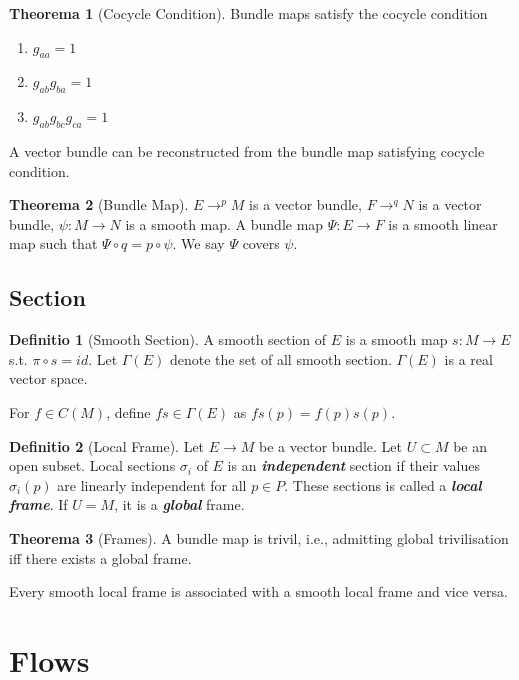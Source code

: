 \documentclass[12pt, a4paper]{article}
\theoremstyle{definition}
\newtheorem{theorem}{Theorema}[section]
\newtheorem{definition}{Definitio}[section]
\theoremstyle{remark}
\renewcommand{\emph}[1]{\textbf{\textit{#1}}}
\begin{document}
\begin{theorem}[Cocycle Condition]
	Bundle maps satisfy the cocycle condition 
	\begin{enumerate}
		\item $g_{aa} = 1$
		\item $g_{ab}g_{ba} = 1$
		\item $g_{ab}g_{bc}g_{ca} = 1$
	\end{enumerate}

	A vector bundle can be reconstructed from the bundle map satisfying cocycle condition.
\end{theorem}

\begin{theorem}[Bundle Map]
	$E \rightarrow^p M$ is a vector bundle, $F \rightarrow^q N $ is a vector bundle, $\psi: M \rightarrow N$ is a smooth map. A bundle map $\Psi: E \rightarrow F$ is a smooth linear map such that $\Psi \circ q = p \circ \psi$.
	We say $\Psi$ covers $\psi$.
\end{theorem}

\subsection{Section}
	
\begin{definition}[Smooth Section]
	A smooth section of $E$ is a smooth map $s: M \rightarrow E$ s.t. $\pi \circ s = id$. 
	Let $\Gamma (E)$ denote the set of all smooth section.
	$\Gamma(E)$ is a real vector space.

	For $f \in C(M)$, define $fs \in \Gamma(E)$ as $fs(p) = f(p)s(p)$.
\end{definition}

\begin{definition}[Local Frame]
	Let $E \rightarrow M$ be a vector bundle. 
	Let $U \subset M$ be an open subset. 
	Local sections $\sigma_i$ of $E$ is an \emph{independent} section if their values $\sigma_i(p)$ are linearly independent for all $p \in P$. These sections is called a \emph{local frame}.
	If $U = M$, it is a \emph{global} frame. 
\end{definition}

\begin{theorem}[Frames]
	A bundle map is trivil, i.e., admitting global trivilisation iff there exists a global frame. 

	Every smooth local frame is associated with a smooth local frame and vice versa.
\end{theorem}
\section{Flows}
\end{document}
